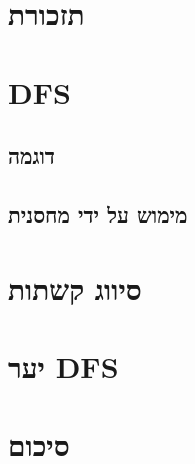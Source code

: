 \documentclass[]{article}
\def\insert#1{}
\begin{document}
\def\lecnum{2}
\def\topcis{
חיפוש לעומק -
\textenglish{Depth First Search (DFS)}
}

\section*{תזכורת}
\insert{reminder}
\section*{DFS}
\insert{dfs}
	\subsection*{דוגמה}
	\insert{example1}
	\subsection*{מימוש על ידי מחסנית}
	\insert{stack}
\section*{סיווג קשתות}
\insert{edges}
\section*{יער DFS}
\insert{forest}
\section*{סיכום}
\insert{conclusion}
\end{document}
